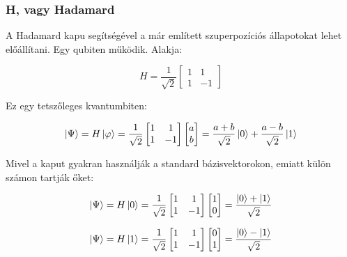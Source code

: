 \documentclass[
]{thesis-ekf}
\theoremstyle{definition}
\theoremstyle{remark}
\begin{document}
\subsubsection{H, vagy Hadamard}
A Hadamard kapu segítségével a már említett szuperpozíciós állapotokat lehet előállítani. Egy qubiten működik. Alakja:

\begin{equation}
	H= \frac{1}{\sqrt{2}}
	\begin{bmatrix}
		1 & 1\\
		1 & -1
	\end{bmatrix}
\end{equation}

Ez egy tetszőleges kvantumbiten:

\begin{equation}
	\ket{\Psi}=H\ket{\varphi}=\frac{1}{\sqrt{2}}
	\begin{bmatrix}
		1 & 1\\
		1 & -1
	\end{bmatrix}
	\begin{bmatrix}
		a\\
		b
	\end{bmatrix}=\frac{a+b}{\sqrt{2}}\ket{0}+\frac{a-b}{\sqrt{2}}\ket{1}
\end{equation}

Mivel a kaput gyakran használják a standard bázisvektorokon, emiatt külön számon tartják őket:

\begin{equation}
	\ket{\Psi}=H\ket{0}=\frac{1}{\sqrt{2}}
	\begin{bmatrix}
		1 & 1\\
		1 & -1
	\end{bmatrix}
	\begin{bmatrix}
		1\\
		0
	\end{bmatrix}=\frac{\ket{0}+\ket{1}}{\sqrt{2}}
\end{equation}

\begin{equation}
	\ket{\Psi}=H\ket{1}=\frac{1}{\sqrt{2}}
	\begin{bmatrix}
		1 & 1\\
		1 & -1
	\end{bmatrix}
	\begin{bmatrix}
		0\\
		1
	\end{bmatrix}=\frac{\ket{0}-\ket{1}}{\sqrt{2}}
\end{equation}
\end{document}
